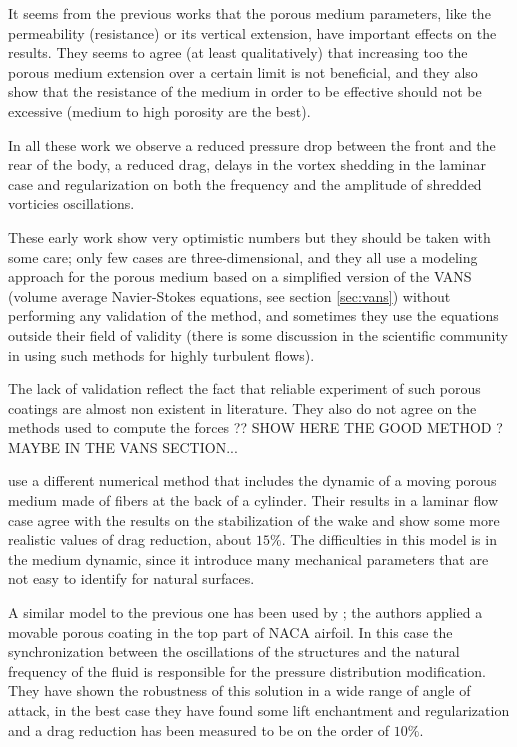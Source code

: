 It seems from the previous works that the porous medium parameters, like the permeability (resistance) or its vertical extension, have important effects on the results.
They seems to agree (at least qualitatively) that increasing too the porous medium extension over a certain limit is not beneficial, and they also show that the resistance of the medium in order to be effective should not be excessive (medium to high porosity are the best).

In all these work we observe a reduced pressure drop between the front and the rear of the body, a reduced drag, delays in the vortex shedding in the laminar case and regularization on both the frequency and the amplitude of shredded vorticies oscillations.

These early work show very optimistic numbers but they should be taken with some care; only few cases are three-dimensional, and they all use a modeling approach for the porous medium based on a simplified version of the VANS (volume average Navier-Stokes equations, see section \ref{sec:vans}) without performing any validation of the method, and sometimes they use the equations outside their field of validity (there is some discussion in the scientific community in using such methods for highly turbulent flows).

The lack of validation reflect the fact that reliable experiment of such porous coatings are almost non existent in literature.
They also do not agree on the methods used to compute the forces \citet{caltagirone1994interaction}?? SHOW HERE THE GOOD METHOD ? MAYBE IN THE VANS SECTION...


\citet{favier2009passive} use a different numerical method that includes the dynamic of a moving porous medium made of fibers at the back of a cylinder.
Their results in a laminar flow case agree with the results on the stabilization of the wake and show some more realistic values of drag reduction, about $15\%$.
The difficulties in this model is in the medium dynamic, since it introduce many mechanical parameters that are not easy to identify for natural surfaces.

A similar model to the previous one has been used by \citet{venkataraman2012numerical}; the authors applied a movable porous coating in the top part of NACA airfoil.
In this case the synchronization between the oscillations of the structures and the natural frequency of the fluid is responsible for the pressure distribution modification.
They have shown the robustness of this solution in a wide range of angle of attack, in the best case they have found some lift enchantment and regularization and a drag reduction has been measured to be on the order of $10\%$.

